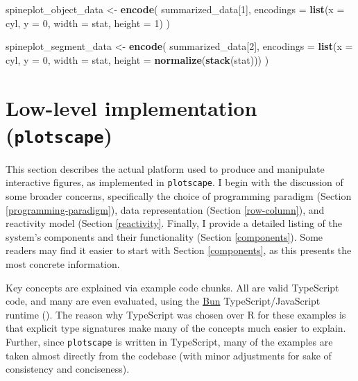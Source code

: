 \documentclass[
  openany]{book}
\newenvironment{Shaded}{\begin{snugshade}}{\end{snugshade}}
\newcommand{\AttributeTok}[1]{\textcolor[rgb]{0.13,0.29,0.53}{#1}}
\newcommand{\DecValTok}[1]{\textcolor[rgb]{0.00,0.00,0.81}{#1}}
\newcommand{\FunctionTok}[1]{\textcolor[rgb]{0.13,0.29,0.53}{\textbf{#1}}}
\newcommand{\NormalTok}[1]{#1}
\newcommand{\OtherTok}[1]{\textcolor[rgb]{0.56,0.35,0.01}{#1}}
\theoremstyle{definition}
\theoremstyle{definition}
\theoremstyle{definition}
\theoremstyle{definition}
\theoremstyle{remark}
\begin{document}
\begin{Shaded}
\begin{Highlighting}[]
\NormalTok{spineplot\_object\_data }\OtherTok{\textless{}{-}} \FunctionTok{encode}\NormalTok{(}
\NormalTok{  summarized\_data[}\DecValTok{1}\NormalTok{],}
  \AttributeTok{encodings =} \FunctionTok{list}\NormalTok{(}\AttributeTok{x =}\NormalTok{ cyl, }\AttributeTok{y =} \DecValTok{0}\NormalTok{, }\AttributeTok{width =}\NormalTok{ stat, }\AttributeTok{height =} \DecValTok{1}\NormalTok{)}
\NormalTok{)}

\NormalTok{spineplot\_segment\_data }\OtherTok{\textless{}{-}} \FunctionTok{encode}\NormalTok{(}
\NormalTok{  summarized\_data[}\DecValTok{2}\NormalTok{],}
  \AttributeTok{encodings =} \FunctionTok{list}\NormalTok{(}\AttributeTok{x =}\NormalTok{ cyl, }\AttributeTok{y =} \DecValTok{0}\NormalTok{, }\AttributeTok{width =}\NormalTok{ stat, }
                   \AttributeTok{height =} \FunctionTok{normalize}\NormalTok{(}\FunctionTok{stack}\NormalTok{(stat)))}
\NormalTok{)}
\end{Highlighting}
\end{Shaded}

\section{\texorpdfstring{Low-level implementation (\texttt{plotscape})}{Low-level implementation (plotscape)}}\label{low-level-implementation}

This section describes the actual platform used to produce and manipulate interactive figures, as implemented in \texttt{plotscape}. I begin with the discussion of some broader concerns, specifically the choice of programming paradigm (Section \ref{programming-paradigm}), data representation (Section \ref{row-column}), and reactivity model (Section \ref{reactivity}. Finally, I provide a detailed listing of the system's components and their functionality (Section \ref{components}). Some readers may find it easier to start with Section \ref{components}, as this presents the most concrete information.

Key concepts are explained via example code chunks. All are valid TypeScript code, and many are even evaluated, using the \href{https://bun.sh/}{Bun} TypeScript/JavaScript runtime (). The reason why TypeScript was chosen over R for these examples is that explicit type signatures make many of the concepts much easier to explain. Further, since \texttt{plotscape} is written in TypeScript, many of the examples are taken almost directly from the codebase (with minor adjustments for sake of consistency and conciseness).
\end{document}
